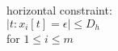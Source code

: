 \documentclass[preview]{standalone}
\begin{document}
\begin{center}
horizontal constraint:\\
            $|t:x_i[t] = \epsilon| \le D_h $\\
            for $1 \le i \le m$
\end{center}
\end{document}
